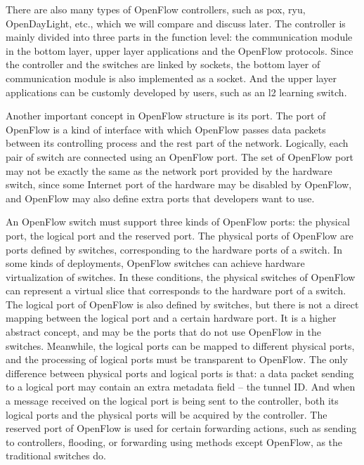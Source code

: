There are also many types of OpenFlow controllers, such as pox, ryu, OpenDayLight, etc., which we will compare and discuss later. The controller is mainly divided into three parts in the function level: the communication module in the bottom layer, upper layer applications and the OpenFlow protocols. Since the controller and the switches are linked by sockets, the bottom layer of communication module is also implemented as a socket. And the upper layer applications can be customly developed by users, such as an l2 learning switch.

Another important concept in OpenFlow structure is its port. The port of OpenFlow is a kind of interface with which OpenFlow passes data packets between its controlling process and the rest part of the network. Logically, each pair of switch are connected using an OpenFlow port. The set of OpenFlow port may not be exactly the same as the network port provided by the hardware switch, since some Internet port of the hardware may be disabled by OpenFlow, and OpenFlow may also define extra ports that developers want to use. 

An OpenFlow switch must support three kinds of OpenFlow ports: the physical port, the logical port and the reserved port. The physical ports of OpenFlow are ports defined by switches, corresponding to the hardware ports of a switch. In some kinds of deployments, OpenFlow switches can achieve hardware virtualization of switches. In these conditions, the physical switches of OpenFlow can represent a virtual slice that corresponds to the hardware port of a switch. The logical port of OpenFlow is also defined by switches, but there is not a direct mapping between the logical port and a certain hardware port. It is a higher abstract concept, and may be the ports that do not use OpenFlow in the switches. Meanwhile, the logical ports can be mapped to different physical ports, and the processing of logical ports must be transparent to OpenFlow. The only difference between physical ports and logical ports is that: a data packet sending to a logical port may contain an extra metadata field -- the tunnel ID. And when a message received on the logical port is being sent to the controller, both its logical ports and the physical ports will be acquired by the controller. The reserved port of OpenFlow is used for certain forwarding actions, such as sending to controllers, flooding, or forwarding using methods except OpenFlow, as the traditional switches do.

